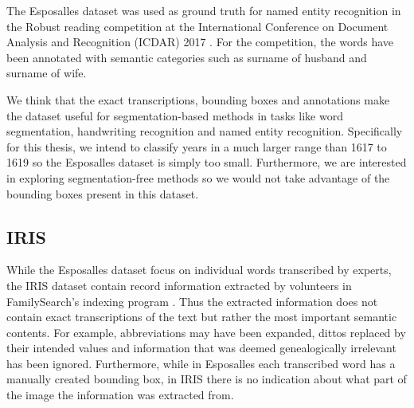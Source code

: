 The Esposalles dataset was used as ground truth for named entity recognition in the Robust reading competition at the International Conference on Document Analysis and Recognition (ICDAR) 2017 \cite{EsposallesCompetition}. For the competition, the words have been annotated with semantic categories such as surname of husband and surname of wife.

We think that the exact transcriptions, bounding boxes and annotations make the dataset useful for segmentation-based methods in tasks like word segmentation, handwriting recognition and named entity recognition.
Specifically for this thesis, we intend to classify years in a much larger range than 1617 to 1619 so the Esposalles dataset is simply too small. Furthermore, we are interested in exploring segmentation-free methods so we would not take advantage of the bounding boxes present in this dataset.




\subsection{IRIS}

While the Esposalles dataset focus on individual words transcribed by experts, the IRIS dataset contain record information extracted by volunteers in FamilySearch's indexing program \cite{Iris}.
Thus the extracted information does not contain exact transcriptions of the text but rather the most important semantic contents.
For example, abbreviations may have been expanded, dittos replaced by their intended values and information that was deemed genealogically irrelevant has been ignored.
Furthermore, while in Esposalles each transcribed word has a manually created bounding box, in IRIS there is no indication about what part of the image the information was extracted from.

